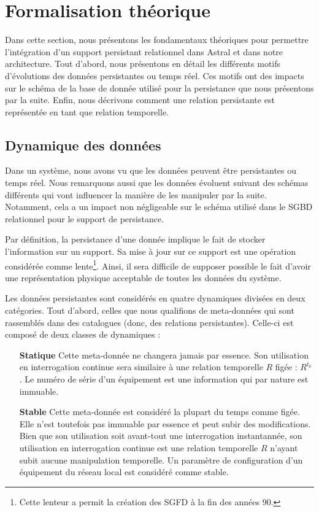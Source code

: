 \section{Formalisation théorique}\label{sec:contrib:asteroid:theorie}
Dans cette section, nous présentons les fondamentaux théoriques pour permettre l'intégration d'un support persistant relationnel dans Astral et dans notre architecture. Tout d'abord, nous présentons en détail les différents motifs d'évolutions des données persistantes ou temps réel. Ces motifs ont des impacts sur le schéma de la base de donnée utilisé pour la persistance que nous présentons par la suite. Enfin, nous décrivons comment une relation persistante est représentée en tant que relation temporelle.

\subsection{Dynamique des données}
Dans un système, nous avons vu que les données peuvent être persistantes ou temps réel. Nous remarquons aussi que les données évoluent suivant des schémas différents qui vont influencer la manière de les manipuler par la suite. Notamment, cela a un impact non négligeable sur le schéma utilisé dans le SGBD relationnel pour le support de persistance.

Par définition, la persistance d'une donnée implique le fait de stocker l'information sur un support. Sa mise à jour sur ce support est une opération considérée comme lente\footnote{Cette lenteur a permit la création des SGFD à la fin des années 90.}. Ainsi, il sera difficile de supposer possible le fait d'avoir une représentation physique acceptable de toutes les données du système.

Les données persistantes sont considérés en quatre dynamiques divisées en deux catégories. Tout d'abord, celles que nous qualifions de meta-données qui sont rassemblés dans des catalogues (donc, des relations persistantes). Celle-ci est composé de deux classes de dynamiques :
\begin{itemize}
	\item[\textbf{Statique}] Cette meta-donnée ne changera jamais par essence. Son utilisation en interrogation continue sera similaire à une relation temporelle $R$ figée : $R^{t_0}$. Le numéro de série d'un équipement est une information qui par nature est immuable.
	\item[\textbf{Stable}] Cette meta-donnée est considéré la plupart du temps comme figée. Elle n'est toutefois pas immuable par essence et peut subir des modifications. Bien que son utilisation soit avant-tout une interrogation instantannée, son utilisation en interrogation continue est une relation temporelle $R$ n'ayant subit aucune manipulation temporelle. Un paramètre de configuration d'un équipement du réseau local est considéré comme stable.
\end{itemize}

